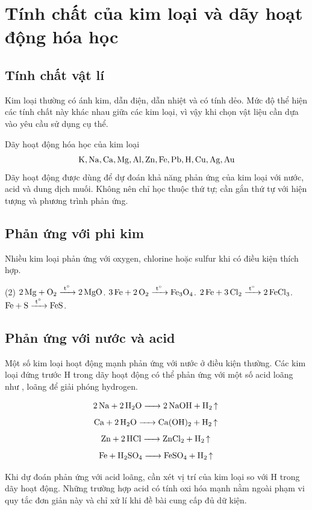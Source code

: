 \section{Tính chất của kim loại và dãy hoạt động hóa học}

\subsection{Tính chất vật lí}

Kim loại thường có ánh kim, dẫn điện, dẫn nhiệt và có tính dẻo. Mức độ thể hiện các tính chất này khác nhau giữa các kim loại, vì vậy khi chọn vật liệu cần dựa vào yêu cầu sử dụng cụ thể.

\begin{ghinho}{Dãy hoạt động hóa học của kim loại}
\[
\ce{K, Na, Ca, Mg, Al, Zn, Fe, Pb, H, Cu, Ag, Au}
\]
Dãy hoạt động được dùng để dự đoán khả năng phản ứng của kim loại với nước, acid và dung dịch muối. Không nên chỉ học thuộc thứ tự; cần gắn thứ tự với hiện tượng và phương trình phản ứng.
\end{ghinho}

\subsection{Phản ứng với phi kim}

Nhiều kim loại phản ứng với oxygen, chlorine hoặc sulfur khi có điều kiện thích hợp.

\begin{tasks}(2)
\task $\ce{2Mg + O2 ->[t^\circ] 2MgO}$.
\task $\ce{3Fe + 2O2 ->[t^\circ] Fe3O4}$.
\task $\ce{2Fe + 3Cl2 ->[t^\circ] 2FeCl3}$.
\task $\ce{Fe + S ->[t^\circ] FeS}$.
\end{tasks}

\subsection{Phản ứng với nước và acid}

Một số kim loại hoạt động mạnh phản ứng với nước ở điều kiện thường. Các kim loại đứng trước H trong dãy hoạt động có thể phản ứng với một số acid loãng như ,  loãng để giải phóng hydrogen.

\[
\ce{2Na + 2H2O -> 2NaOH + H2 ^}
\]
\[
\ce{Ca + 2H2O -> Ca(OH)2 + H2 ^}
\]
\[
\ce{Zn + 2HCl -> ZnCl2 + H2 ^}
\]
\[
\ce{Fe + H2SO4 -> FeSO4 + H2 ^}
\]

\begin{notechem}
Khi dự đoán phản ứng với acid loãng, cần xét vị trí của kim loại so với H trong dãy hoạt động. Những trường hợp acid có tính oxi hóa mạnh nằm ngoài phạm vi quy tắc đơn giản này và chỉ xử lí khi đề bài cung cấp đủ dữ kiện.
\end{notechem}

